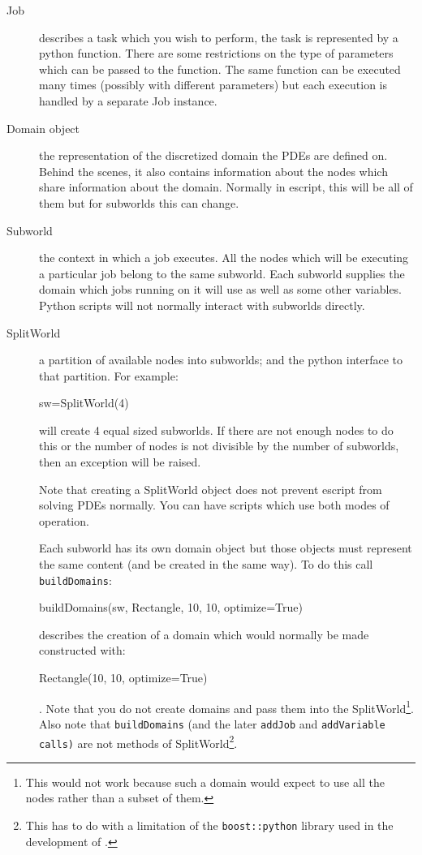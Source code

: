 \begin{description}
 \item[Job] describes a task which you wish to perform, the task is represented by a python function.
There are some restrictions on the type of parameters which can be passed to the function. 
The same function can be executed many times (possibly with different parameters) but each execution is 
handled by a separate Job instance.
\item[Domain object] the representation of the discretized domain the PDEs are defined on.
Behind the scenes, it also contains information about the nodes which share information about the domain.
Normally in escript, this will be all of them but for subworlds this can change.
\item[Subworld] the context in which a job executes.
All the nodes which will be executing a particular job belong to the same subworld.
Each subworld supplies the domain which jobs running on it will use as well as some other variables.
Python scripts will not normally interact with subworlds directly.
\item[SplitWorld] a partition of available nodes into subworlds; and the python interface to that partition.
For example:
\begin{python}
sw=SplitWorld(4) 
\end{python}
will create 4 equal sized subworlds.
If there are not enough nodes to do this or the number of nodes is not divisible by the 
number of subworlds, then an exception will be raised.

Note that creating a SplitWorld object does not prevent escript from solving PDEs normally.
You can have scripts which use both modes of operation.

Each subworld has its own domain object but those objects must represent the same content (and be created in the same way).
To do this call \texttt{buildDomains}:
\begin{python}
buildDomains(sw, Rectangle,  10, 10, optimize=True)
\end{python}
describes the creation of a domain which would normally be made constructed with:
\begin{python}
Rectangle(10, 10, optimize=True)
\end{python}.
Note that you do not create domains and pass them into the SplitWorld\footnote{
This would not work because such a domain would expect to use all the nodes rather than a subset of them.}.
Also note that \texttt{buildDomains} (and the later \texttt{addJob} and \texttt{addVariable calls)} are not methods of SplitWorld\footnote{
This has to do with a limitation of the \texttt{boost::python} library used in the development of \escript.}.


\end{description}
